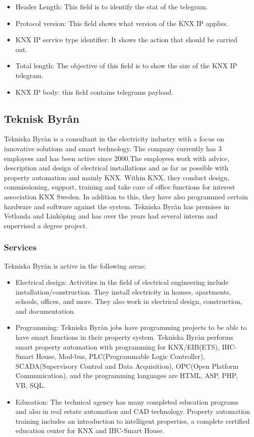 \documentclass{article}
\begin{document}
\begin{enumerate}
    \begin{itemize}
        \item Header Length: This field is to identify the stat of the telegram. 
        \item Protocol version: This field shows what version of the KNX IP applies. 
        \item KNX IP service type identifier: It shows the action that should be carried out.
        \item Total length: The objective of this field is to show the size of the KNX IP telegram.
        \item KNX IP body: this field contains telegrams payload. \cite{KNXBasic}
    \end{itemize}
\end{enumerate}
\subsection{Teknisk Byrån}
Tekniska Byrån is a consultant in the electricity industry with a focus on innovative solutions and smart technology. The company currently has 3 employees and has been active since 2000.The employees work with advice, description and design of electrical installations and as far as possible with property automation and mainly KNX. Within KNX, they conduct design, commissioning, support, training and take care of office functions for interest association KNX Sweden. In addition to this, they have also programmed certain hardware and software against the system. Tekniska Byrån has premises in Vetlanda and Linköping and has over the years had several interns and supervised a degree project.\cite{tekAbout} 
\subsubsection{Services}
Tekniska Byrån is active in the following areas:
\begin{itemize}
    \item Electrical design: Activities in the field of electrical engineering include installation/construction. They install electricity in houses, apartments, schools, offices, and more. They also work in electrical design, construction, and documentation.\cite{tekelproj} 
    \item Programming: Tekniska Byrån jobs have programming projects to be able to have 
    smart functions in their property system. Tekniska Byrån performs smart property automation with programming for
 KNX/EIB(ETS), IHC-Smart House, Mod-bus, PLC(Programmable Logic Controller), 
 SCADA(Supervisory Control and Data Acquisition), OPC(Open Platform Communication),
 and the programming languages are HTML, ASP, PHP, VB, SQL.\cite{tekprog} 
    \item Education: The technical agency has many completed education programs and also in real estate automation and CAD technology. Property automation training includes an introduction to intelligent properties, a complete certified education center for KNX and IHC-Smart House.\cite{tekut} 
\end{itemize}
\end{document}
